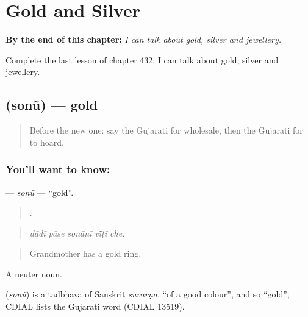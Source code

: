 
\chapter{Gold and Silver}
\label{ch:gu-gold-and-silver}

\begin{chapteropening}
\textbf{By the end of this chapter:} \emph{I can talk about gold, silver and jewellery.}

Complete the last lesson of chapter 432: I can talk about gold, silver and jewellery.
\end{chapteropening}

\section[\texorpdfstring{\gu{સોનું} (sonũ)}{સોનું (sonũ)}]{ (sonũ) — gold}

\label{lesson:GU-C432-sonu}



\begin{quote}
Before the new one: say the Gujarati for wholesale, then the Gujarati for to hoard.
\end{quote}

\subsection*{You'll want to know: }
\textbf{} — \emph{sonũ} — \textquotedblleft{}gold\textquotedblright{}.

\begin{quote}
    .
\end{quote}

\begin{quote}
\emph{dādī pāse sonānī vī̃ṭī che.}
\end{quote}

\begin{quote}
Grandmother has a gold ring.
\end{quote}

A neuter noun.

\begin{cousinweb}
\textbf{} (\emph{sonũ}) is a tadbhava of Sanskrit \emph{suvarṇa}, \textquotedblleft{}of a good colour\textquotedblright{}, and so \textquotedblleft{}gold\textquotedblright{}; CDIAL lists the Gujarati word (CDIAL 13519).
\end{cousinweb}

